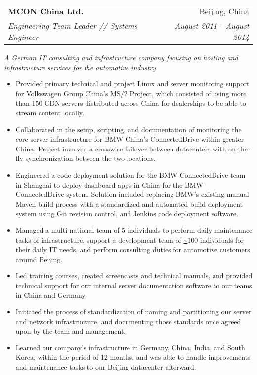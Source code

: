 \documentclass[a4paper,11pt]{article}
\makeatletter
\newcommand{\resitem}[1]{\item #1 \vspace{-2pt}}
\newcommand{\ressubheading}[4]{
\begin{tabular*}{6.5in}{l@{\cftdotfill{\cftsecdotsep}\extracolsep{\fill}}r}
        \textbf{#1} & #2 \\
        \textit{#3} & \textit{#4} \\
\end{tabular*}\vspace{-6pt}}
\makeatother
\begin{document}
\begin{itemize}
    \ressubheading{MCON China Ltd.}{Beijing, China}{Engineering Team Leader // Systems Engineer}{August 2011 - August 2014}
    \linebreak
    \linebreak
    \emph{A German IT consulting and infrastructure company focusing on hosting and infrastructure services for the automotive industry.}
    \begin{itemize}
            \resitem{Provided primary technical and project Linux and server monitoring support for Volkswagen Group China’s MS/2 Project, which consisted of using more than 150 CDN servers distributed across China for dealerships to be able to stream content locally.}

            \resitem{Collaborated in the setup, scripting, and documentation of monitoring the core server infrastructure for BMW China's ConnectedDrive within greater China. Project involved a crosswise failover between datacenters with on-the-fly synchronization between the two locations.}

            \resitem{Engineered a code deployment solution for the BMW ConnectedDrive team in Shanghai to deploy dashboard apps in China for the BMW ConnectedDrive system. Solution included replacing BMW's existing manual Maven build process with a standardized and automated build deployment system using Git revision control, and Jenkins code deployment software.}

            \resitem{Managed a multi-national team of 5 individuals to perform daily maintenance tasks of infrastructure, support a development team of \url{~}100 individuals for their daily IT needs, and perform consulting duties for automotive customers around Beijing.}

            \resitem{Led training courses, created screencasts and technical manuals, and provided technical support for our internal server documentation software to our teams in China and Germany.}

            \resitem{Initiated the process of standardization of naming and partitioning our server and network infrastructure, and documenting those standards once agreed upon by the team and management.}

            \resitem{Learned our company’s infrastructure in Germany, China, India, and South Korea, within the period of 12 months, and was able to handle improvements and maintenance tasks to our Beijing datacenter afterward.}

    \end{itemize}


\end{itemize}
\end{document}
